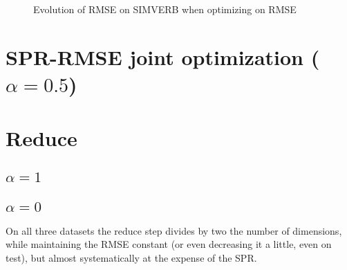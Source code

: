 \documentclass[utf8]{article}
\begin{document}
\begin{figure}[h!tpb]
\begin{minipage}[t]{.48\linewidth}
{
  }
  \caption{Evolution of RMSE on SIMVERB when optimizing on RMSE}
   \end{minipage}
\end{figure}

\section{SPR-RMSE joint optimization ($\alpha=0.5$)}

\section{Reduce}

\subsection{$\alpha=1$}

\subsection{$\alpha=0$}
On all three datasets the reduce step divides by two the number of dimensions, while maintaining the RMSE constant (or even decreasing it a little, even on test), but almost systematically at the expense of the SPR.
\end{document}

